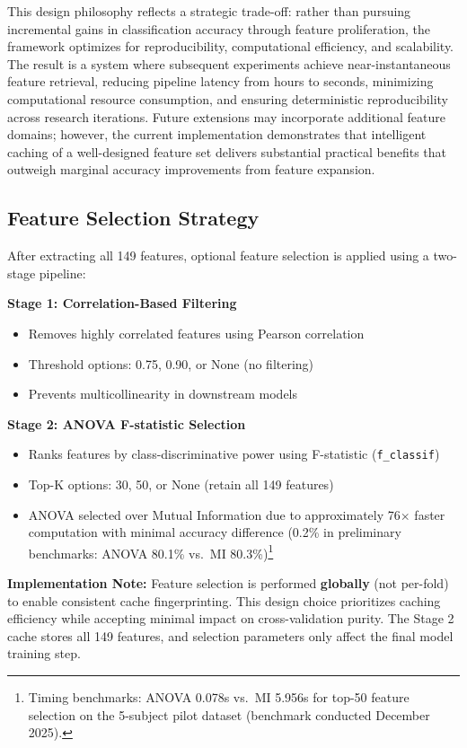 \documentclass{imc-inf} %
\begin{document}
This design philosophy reflects a strategic trade-off: rather than pursuing incremental gains in classification accuracy through feature proliferation, the framework optimizes for reproducibility, computational efficiency, and scalability. The result is a system where subsequent experiments achieve near-instantaneous feature retrieval, reducing pipeline latency from hours to seconds, minimizing computational resource consumption, and ensuring deterministic reproducibility across research iterations. Future extensions may incorporate additional feature domains; however, the current implementation demonstrates that intelligent caching of a well-designed feature set delivers substantial practical benefits that outweigh marginal accuracy improvements from feature expansion.

\subsection{Feature Selection Strategy}

After extracting all 149 features, optional feature selection is applied using a two-stage pipeline:

\textbf{Stage 1: Correlation-Based Filtering}
\begin{itemize}
\item Removes highly correlated features using Pearson correlation
\item Threshold options: 0.75, 0.90, or None (no filtering)
\item Prevents multicollinearity in downstream models
\end{itemize}

\textbf{Stage 2: ANOVA F-statistic Selection}
\begin{itemize}
\item Ranks features by class-discriminative power using F-statistic (\texttt{f\_classif})
\item Top-K options: 30, 50, or None (retain all 149 features)
\item ANOVA selected over Mutual Information due to approximately 76$\times$ faster computation with minimal accuracy difference (0.2\% in preliminary benchmarks: ANOVA 80.1\% vs.\ MI 80.3\%)\footnote{Timing benchmarks: ANOVA 0.078s vs.\ MI 5.956s for top-50 feature selection on the 5-subject pilot dataset (benchmark conducted December 2025).}
\end{itemize}

\textbf{Implementation Note:} Feature selection is performed \textbf{globally} (not per-fold) to enable consistent cache fingerprinting. This design choice prioritizes caching efficiency while accepting minimal impact on cross-validation purity. The Stage 2 cache stores all 149 features, and selection parameters only affect the final model training step.
\end{document}
